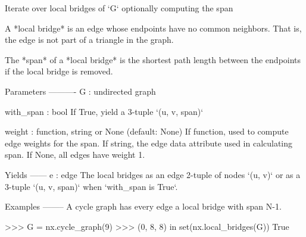 \begin{DoxyVerb}Iterate over local bridges of `G` optionally computing the span

A *local bridge* is an edge whose endpoints have no common neighbors.
That is, the edge is not part of a triangle in the graph.

The *span* of a *local bridge* is the shortest path length between
the endpoints if the local bridge is removed.

Parameters
----------
G : undirected graph

with_span : bool
    If True, yield a 3-tuple `(u, v, span)`

weight : function, string or None (default: None)
    If function, used to compute edge weights for the span.
    If string, the edge data attribute used in calculating span.
    If None, all edges have weight 1.

Yields
------
e : edge
    The local bridges as an edge 2-tuple of nodes `(u, v)` or
    as a 3-tuple `(u, v, span)` when `with_span is True`.

Examples
--------
A cycle graph has every edge a local bridge with span N-1.

   >>> G = nx.cycle_graph(9)
   >>> (0, 8, 8) in set(nx.local_bridges(G))
   True
\end{DoxyVerb}
 